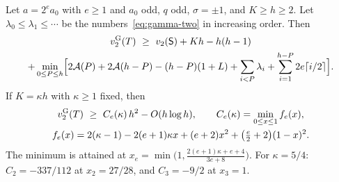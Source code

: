 \begin{theorem}\label{thm:two-even}
Let $a=2^ea_0$ with $e\ge1$ and $a_0$ odd, $q$ odd, $\sigma=\pm1$, and $K\ge h\ge2$. Let
$\lambda_0\le\lambda_1\le\cdots$ be the numbers~\eqref{eq:gamma-two} in increasing order. Then
\begin{multline*}
  v_{2}^{\mathrm{G}}(T)\ \ge\ v_2(\mathsf{S})+Kh-h(h-1)\\
  +\min_{0\le P\le h}\Bigl[2\mathcal{A}(P)+2\mathcal{A}(h-P)-(h-P)(1+L)+\sum_{i<P}\lambda_i
  +\sum_{i=1}^{h-P}2e\lceil i/2\rceil\Bigr].
\end{multline*}
If $K=\kappa h$ with $\kappa\ge1$ fixed, then
\begin{gather}
  v_{2}^{\mathrm{G}}(T)\ \ge\ C_e(\kappa)\,h^2-O(h\log h),\qquad C_e(\kappa)=\min_{0\le x\le1}f_e(x),
  \label{eq:two-asymptotic}\\
  f_e(x)=2(\kappa-1)-2(e+1)\kappa x+(e+2)x^2+\bigl(\tfrac e2+2\bigr)(1-x)^2.\notag
\end{gather}
The minimum is attained at $x_e=\min\bigl(1,\frac{2(e+1)\kappa+e+4}{3e+8}\bigr)$. For
$\kappa=5/4$: $C_2=-337/112$ at $x_2=27/28$, and $C_3=-9/2$ at $x_3=1$.
\end{theorem}

